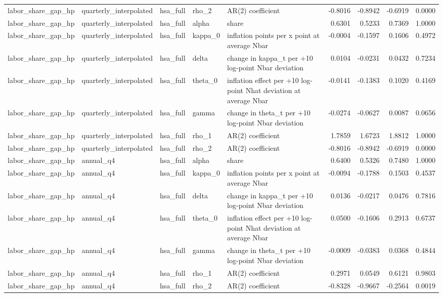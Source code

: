 \begin{tabular}{lllllrrrr}
labor\_share\_gap\_hp & quarterly\_interpolated & hsa\_full & rho\_2 & AR(2) coefficient & -0.8016 & -0.8942 & -0.6919 & 0.0000 \\
labor\_share\_gap\_hp & quarterly\_interpolated & hsa\_full & alpha & share & 0.6301 & 0.5233 & 0.7369 & 1.0000 \\
labor\_share\_gap\_hp & quarterly\_interpolated & hsa\_full & kappa\_0 & inflation points per x point at average Nbar & -0.0004 & -0.1597 & 0.1606 & 0.4972 \\
labor\_share\_gap\_hp & quarterly\_interpolated & hsa\_full & delta & change in kappa\_t per +10 log-point Nbar deviation & 0.0104 & -0.0231 & 0.0432 & 0.7234 \\
labor\_share\_gap\_hp & quarterly\_interpolated & hsa\_full & theta\_0 & inflation effect per +10 log-point Nhat deviation at average Nbar & -0.0141 & -0.1383 & 0.1020 & 0.4169 \\
labor\_share\_gap\_hp & quarterly\_interpolated & hsa\_full & gamma & change in theta\_t per +10 log-point Nbar deviation & -0.0274 & -0.0627 & 0.0087 & 0.0656 \\
labor\_share\_gap\_hp & quarterly\_interpolated & hsa\_full & rho\_1 & AR(2) coefficient & 1.7859 & 1.6723 & 1.8812 & 1.0000 \\
labor\_share\_gap\_hp & quarterly\_interpolated & hsa\_full & rho\_2 & AR(2) coefficient & -0.8016 & -0.8942 & -0.6919 & 0.0000 \\
labor\_share\_gap\_hp & annual\_q4 & hsa\_full & alpha & share & 0.6400 & 0.5326 & 0.7480 & 1.0000 \\
labor\_share\_gap\_hp & annual\_q4 & hsa\_full & kappa\_0 & inflation points per x point at average Nbar & -0.0094 & -0.1788 & 0.1503 & 0.4537 \\
labor\_share\_gap\_hp & annual\_q4 & hsa\_full & delta & change in kappa\_t per +10 log-point Nbar deviation & 0.0136 & -0.0217 & 0.0476 & 0.7816 \\
labor\_share\_gap\_hp & annual\_q4 & hsa\_full & theta\_0 & inflation effect per +10 log-point Nhat deviation at average Nbar & 0.0500 & -0.1606 & 0.2913 & 0.6737 \\
labor\_share\_gap\_hp & annual\_q4 & hsa\_full & gamma & change in theta\_t per +10 log-point Nbar deviation & -0.0009 & -0.0383 & 0.0368 & 0.4844 \\
labor\_share\_gap\_hp & annual\_q4 & hsa\_full & rho\_1 & AR(2) coefficient & 0.2971 & 0.0549 & 0.6121 & 0.9803 \\
labor\_share\_gap\_hp & annual\_q4 & hsa\_full & rho\_2 & AR(2) coefficient & -0.8328 & -0.9667 & -0.2564 & 0.0019 \\

\end{tabular}
